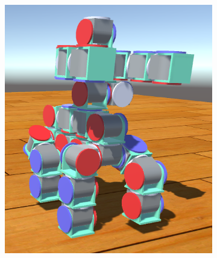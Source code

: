 \documentclass[graybox]{svmult}
\begin{document}
\begin{figure}
\begin{center}
        \begin{subfigure}[b]{0.23\columnwidth}
                \includegraphics[width=\textwidth]{images/library/unity/step1.png}
                \caption{}
                \label{fig:step1}
           \end{subfigure}
        \begin{subfigure}[b]{0.23\columnwidth}

\end{subfigure}
\end{center}
\end{figure}
\end{document}
